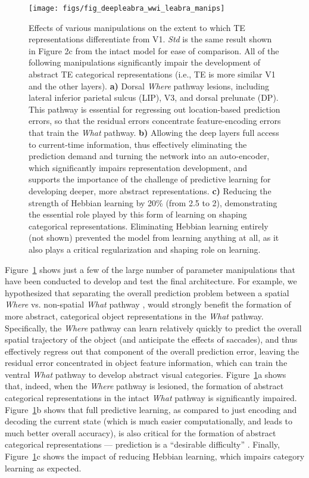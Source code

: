 \documentclass[12pt,twoside,lineno]{pnas-new}  %
\begin{document}
\begin{figure}
  \centering\texttt{[image: figs/fig\_deepleabra\_wwi\_leabra\_manips]}
  \caption{\small  Effects of various manipulations on the extent to which TE representations differentiate from V1.  {\em Std} is the same result shown in Figure 2c from the intact model for ease of comparison.  All of the following  manipulations significantly impair the development of abstract TE categorical representations (i.e., TE is more similar V1 and the other layers).  {\bf a)} Dorsal {\em Where} pathway lesions, including lateral inferior parietal sulcus (LIP), V3, and dorsal prelunate (DP).  This pathway is essential for regressing out location-based prediction errors, so that the residual errors concentrate feature-encoding errors that train the {\em What} pathway.  {\bf b)} Allowing the deep layers full access to current-time information, thus effectively eliminating the prediction demand and turning the network into an auto-encoder, which significantly impairs representation development, and supports the importance of the challenge of predictive learning for developing deeper, more abstract representations.  {\bf c)} Reducing the strength of Hebbian learning by 20\% (from 2.5 to 2), demonstrating the essential role played by this form of learning on shaping categorical representations.  Eliminating Hebbian learning entirely (not shown) prevented the model from learning anything at all, as it also plays a critical regularization and shaping role on learning.}
  \label{fig.manips}
\end{figure}

Figure~\ref{fig.manips} shows just a few of the large number of parameter manipulations that have been conducted to develop and test the final architecture.  For example, we hypothesized that separating the overall prediction problem between a spatial {\em Where} vs. non-spatial {\em What} pathway \cite{UngerleiderMishkin82,GoodaleMilner92}, would strongly benefit the formation of more abstract, categorical object representations in the {\em What} pathway.  Specifically, the {\em Where} pathway can learn relatively quickly to predict the overall spatial trajectory of the object (and anticipate the effects of saccades), and thus effectively regress out that component of the overall prediction error, leaving the residual error concentrated in object feature information, which can train the ventral {\em What} pathway to develop abstract visual categories.  Figure~\ref{fig.manips}a shows that, indeed, when the {\em Where} pathway is lesioned, the formation of abstract categorical representations in the intact {\em What} pathway is significantly impaired.  Figure~\ref{fig.manips}b shows that full predictive learning, as compared to just encoding and decoding the current state (which is much easier computationally, and leads to much better overall accuracy), is also critical for the formation of abstract categorical representations --- prediction is a ``desirable difficulty'' \cite{Bjork94}.  Finally, Figure~\ref{fig.manips}c shows the impact of reducing Hebbian learning, which impairs category learning as expected.
\end{document}
